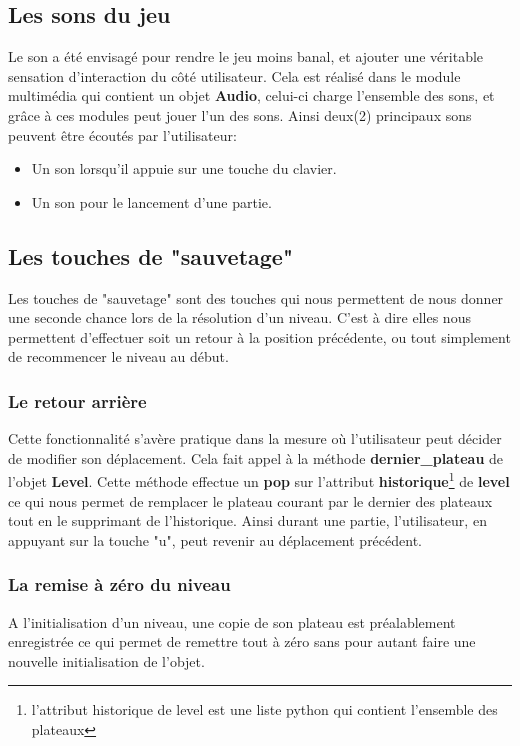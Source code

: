\documentclass[a4paper,12pt]{article} %
\begin{document}
\newpage
\subsection{Les sons du jeu}
Le son a été envisagé pour rendre le jeu moins banal, et ajouter une véritable sensation d'interaction du côté utilisateur.
Cela est réalisé dans le module multimédia qui contient un objet \textbf{Audio}, celui-ci charge l'ensemble des sons, et grâce à ces modules peut jouer l'un des sons.
Ainsi deux(2) principaux sons peuvent être écoutés par l'utilisateur:
\begin{itemize}
	\item Un son lorsqu'il appuie sur une touche du clavier.
	\item Un son pour le lancement d'une partie.
\end{itemize}

\subsection{Les touches de "sauvetage"}

Les touches de "sauvetage" sont des touches qui nous permettent de nous donner une seconde chance lors de la résolution d'un niveau. C'est à dire elles nous permettent d'effectuer soit un retour à la position précédente, ou tout simplement de recommencer le niveau au début.

\subsubsection{Le retour arrière}

Cette fonctionnalité s'avère pratique dans la mesure où l'utilisateur peut décider de modifier son déplacement.
Cela fait appel à la méthode \textbf{dernier\_plateau} de l'objet \textbf{Level}.
Cette méthode effectue un \textbf{pop} sur l'attribut \textbf{historique}\footnote{l'attribut historique de level est une liste python qui contient l'ensemble des plateaux } de \textbf{level} ce qui nous permet de remplacer le plateau courant par le dernier des plateaux tout en le supprimant de l'historique.
Ainsi durant une partie, l'utilisateur, en appuyant sur la touche "u", peut revenir au déplacement précédent.

\subsubsection{La remise à zéro du niveau}

A l'initialisation d'un niveau, une copie de son plateau est préalablement enregistrée ce qui permet de remettre tout à zéro sans pour autant faire une nouvelle initialisation de l'objet.
\end{document}
